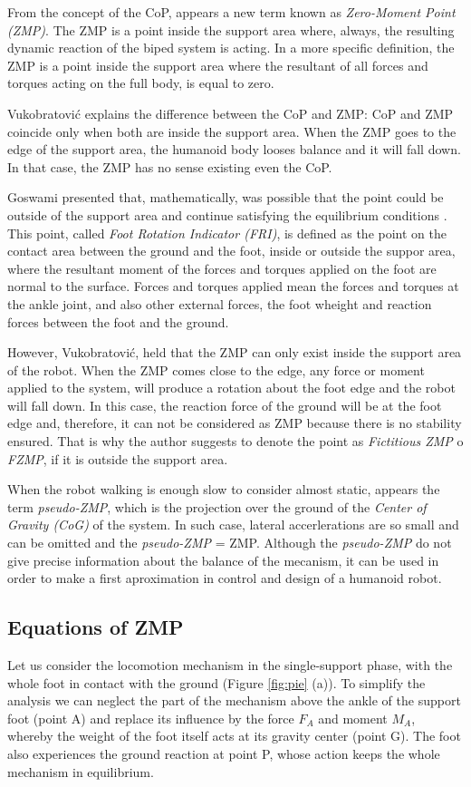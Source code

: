 From the concept of the CoP, appears a new term known as \textit{Zero-Moment Point (ZMP)}. The ZMP is a point inside the support area where, always, the resulting dynamic reaction of the biped system is acting. In a more specific definition, the ZMP is a point inside the support area where the resultant of all forces and torques acting on the full body, is equal to zero.

Vukobratović \cite{Vuk2007} explains the difference between the CoP and ZMP: CoP and ZMP coincide only when both are inside the support area. When the ZMP goes to the edge of the support area, the humanoid body looses balance and it will fall down. In that case, the ZMP has no sense existing even the CoP.

Goswami presented that, mathematically, was possible that the point could be outside of the support area and continue satisfying the equilibrium conditions \cite{Gos}. This point, called \textit{Foot Rotation Indicator (FRI)}, is defined as the point on the contact area between the ground and the foot, inside or outside the suppor area, where the resultant moment of the forces and torques applied on the foot are normal to the surface. Forces and torques applied mean the forces and torques at the ankle joint, and also other external forces, the foot wheight and reaction forces between the foot and the ground. 

However, Vukobratović, held that the ZMP can only exist inside the support area of the robot. When the ZMP comes close to the edge, any force or moment applied to the system, will produce a rotation about the foot edge and the robot will fall down. In this case, the reaction force of the ground will be at the foot edge and, therefore, it can not be considered as ZMP because there is no stability ensured. That is why the author suggests to denote the point as \textit{Fictitious ZMP} o \textit{FZMP}, if it is outside the support area. 
 
When the robot walking is enough slow to consider almost static, appears the term \textit{pseudo-ZMP}, which is the projection over the ground of the \textit{Center of Gravity (CoG)} of the system. In such case, lateral accerlerations are so small and can be omitted and the \textit{pseudo-ZMP} = ZMP. Although the \textit{pseudo-ZMP} do not give precise information about the balance of the mecanism, it can be used in order to make a first aproximation in control and design of a humanoid robot.



\subsection{Equations of ZMP}
Let us consider the locomotion mechanism in the single-support phase, with the whole foot in contact with the ground (Figure \ref{fig:pie} (a)). To simplify the analysis we can neglect the part of the mechanism above the ankle of the support foot (point A) and replace its influence by the force $F_A$ and moment $M_A$, whereby the weight of the foot itself acts at its gravity center (point G). The foot also experiences the ground reaction at point P, whose action keeps the whole mechanism in equilibrium.

